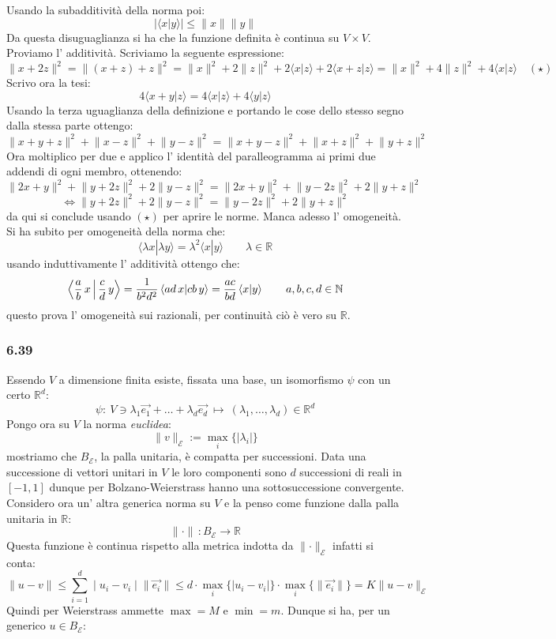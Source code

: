 \documentclass[a4paper,11pt]{article}
\newcommand{\ex}[1]{\subsubsection*{#1}}
\newcommand{\NN}{\mathbb{N}}
\newcommand{\RR}{\mathbb{R}}
\newcommand{\cart}{\times}
\newcommand{\Norm}[1]{ \lVert {#1} \rVert}
\newcommand{\norm}[1]{\mid{#1}\mid}
\begin{document}
Usando la subadditività della norma poi:
$$
\norm{\langle x|y\rangle} \leq \Norm{x}\Norm{y}
$$
Da questa disuguaglianza si ha che la funzione definita è continua su $V\cart V$.
Proviamo l' additività. Scriviamo la seguente espressione:
$$
\Norm{x+2z}^2=\Norm{(x+z)+z}^2=\Norm{x}^2+2\Norm{z}^2+2\langle x| z\rangle +2\langle x+z|z\rangle=\Norm{x}^2+4\Norm{z}^2+4\langle x| z\rangle\quad (\star)
$$
Scrivo ora la tesi:
$$
4\langle x+y |z\rangle=4\langle x|z \rangle + 4\langle y|z \rangle
$$
Usando la terza uguaglianza della definizione e portando le cose dello stesso segno dalla stessa parte ottengo:
$$
\Norm{x+y+z}^2+\Norm{x-z}^2+\Norm{y-z}^2=\Norm{x+y-z}^2+\Norm{x+z}^2+\Norm{y+z}^2
$$
Ora moltiplico per due e applico l' identità del paralleogramma ai primi due addendi di ogni membro, ottenendo:
$$
\Norm{2x+y}^2+\Norm{y+2z}^2+2\Norm{y-z}^2=\Norm{2x+y}^2+\Norm{y-2z}^2+2\Norm{y+z}^2
$$
$$
\Leftrightarrow \Norm{y+2z}^2+2\Norm{y-z}^2=\Norm{y-2z}^2+2\Norm{y+z}^2
$$
da qui si conclude usando $(\star)$ per aprire le norme.
Manca adesso l' omogeneità. Si ha subito per omogeneità della norma che:
$$
\langle \lambda x|\lambda y\rangle= \lambda ^2 \langle x|y\rangle  \qquad \lambda\in \RR
$$
usando induttivamente l' additività ottengo che:
$$
\Braket{\frac{a}{b}\, x|\frac{c}{d}\, y}=\frac{1}{b^2d^2}\left\langle ad\, x|cb\, y\right\rangle=\frac{ac}{bd}\left\langle x|y\right\rangle\qquad a,b,c,d \in \NN
$$
questo prova l' omogeneità sui razionali, per continuità ciò è vero su $\RR$. 
\ex{6.39} Essendo $V$ a dimensione finita esiste, fissata una base, un isomorfismo $\psi$ con un certo $\RR^d$:
$$
\psi: \ V\ni\lambda_1\vec{e_1}+\ldots+\lambda_d\vec{e_d}\ \mapsto\  (\lambda_1,\ldots,\lambda_d)\in\RR^d
$$
Pongo ora su $V$ la norma  {\it euclidea}:
$$
\Norm{v}_{\mathcal{E}}:=\max_i\{\norm{\lambda_i}\}
$$
mostriamo che $B_{\mathcal{E}}$, la palla unitaria, è compatta per successioni. Data una successione di vettori unitari in $V$ le loro componenti sono $d$ successioni di reali in $[-1,1]$ dunque per Bolzano-Weierstrass hanno una sottosuccessione convergente. Considero ora un' altra generica norma su $V$ e la penso come funzione dalla palla unitaria in $\RR$:
$$\Norm{\cdot}\, : B_{\mathcal{E}}\rightarrow \RR$$
Questa funzione è continua rispetto alla metrica indotta da $\Norm{\cdot}_{\mathcal{E}}$ infatti si conta:
$$
\Norm{u-v}\leq\sum_{i=1}^{d}\norm{u_i-v_i}\Norm{\vec{e_i}}\leq d\cdot\max_i\{\norm{u_i-v_i}\}\cdot \max_i\{\Norm{\vec{e_i}}\}=K \Norm{u-v}_{\mathcal{E}}
$$
Quindi per Weierstrass ammette $\max=M$ e $\min=m$. Dunque si ha, per un generico $u\in B_{\mathcal{E}}$: 
\end{document}
